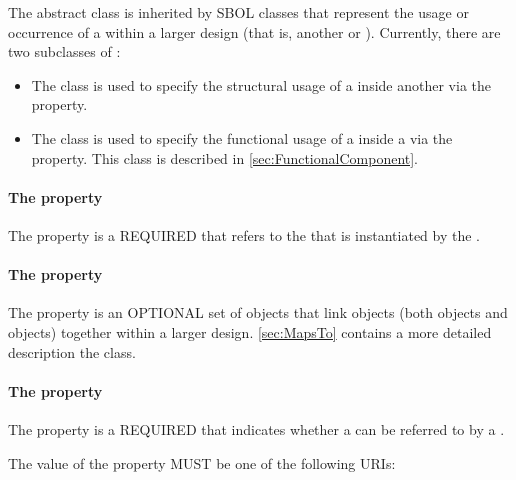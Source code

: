The  abstract class is inherited by SBOL classes that represent the usage or occurrence of a  within a larger design (that is, another  or ). Currently, there are two subclasses of :
\begin{itemize}
\item The  class is used to specify the structural usage of a  inside another  via the  property.
\item The  class is used to specify the functional usage of a  inside a  via the  property. This class is described in \ref{sec:FunctionalComponent}.
\end{itemize}

\paragraph{The  property}
\label{sec:definition}

The  property is a REQUIRED  that refers to the  that is instantiated by the .

\paragraph{The  property}
\label{sec:mapsTos}

The  property is an OPTIONAL set of  objects that link  objects (both  objects and  objects) together within a larger design. \ref{sec:MapsTo} contains a more detailed description the  class.

\paragraph{The  property}
\label{sec:access}

The  property is a REQUIRED  that indicates whether a  
can be referred to by a .

The value of the  property MUST be one of the following URIs:

